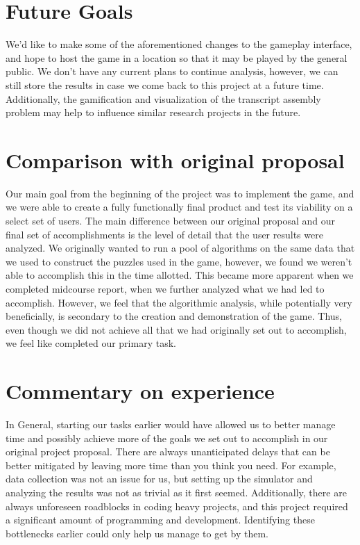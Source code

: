 \documentclass[12pt]{article}
\begin{document}
\section*{Future Goals}

We'd like to make some of the aforementioned changes to the gameplay interface, and hope to host the game in a location so that it may be played by the general public.
We don't have any current plans to continue analysis, however, we can still store the results in case we come back to this project at a future time. Additionally, the gamification and
visualization of the transcript assembly problem may help to influence similar research projects in the future.

\section*{Comparison with original proposal}

Our main goal from the beginning of the project was to implement the game, and we were able to create a fully functionally final product and test its viability on a select set of users. The main
difference between our original proposal and our final set of accomplishments is the level of detail that the user results were analyzed. We originally wanted to run a pool of algorithms
on the same data that we used to construct the puzzles used in the game, however, we found we weren't able to accomplish this in the time allotted. This became more apparent when we
completed midcourse report, when we further analyzed what we had led to accomplish. However, we feel that the
 algorithmic analysis, while potentially very beneficially, is secondary to the creation and demonstration of the game. Thus, even though we did not achieve all that we had originally set out to
  accomplish, we feel like completed our primary task.

\section*{Commentary on experience}

In General, starting our tasks earlier would have allowed us to better manage time and possibly achieve more of the goals we set out to accomplish in our original project proposal.
There are always unanticipated delays that can be better mitigated by leaving more time than you think you need. For example, data collection was not an issue for us, but
setting up the simulator and analyzing the results was not as trivial as it first seemed. Additionally, there are always unforeseen roadblocks in coding heavy projects, and this project
required a significant amount of programming and development. Identifying these bottlenecks earlier could only help us manage to get by them.
\end{document}
